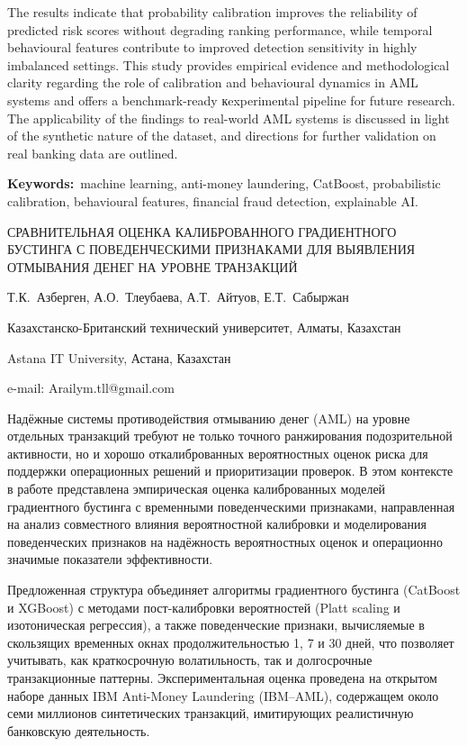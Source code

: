 The results indicate that probability calibration improves the
reliability of predicted risk scores without degrading ranking
performance, while temporal behavioural features contribute to improved
detection sensitivity in highly imbalanced settings. This study provides
empirical evidence and methodological clarity regarding the role of
calibration and behavioural dynamics in AML systems and offers a
benchmark-ready кexperimental pipeline for future research. The
applicability of the findings to real-world AML systems is discussed in
light of the synthetic nature of the dataset, and directions for further
validation on real banking data are outlined.

{\bfseries Keywords:}~machine learning, anti-money laundering, CatBoost,
probabilistic calibration, behavioural features, financial fraud
detection, explainable AI.

\begin{header}
СРАВНИТЕЛЬНАЯ ОЦЕНКА КАЛИБРОВАННОГО ГРАДИЕНТНОГО БУСТИНГА С ПОВЕДЕНЧЕСКИМИ ПРИЗНАКАМИ ДЛЯ ВЫЯВЛЕНИЯ ОТМЫВАНИЯ ДЕНЕГ НА УРОВНЕ ТРАНЗАКЦИЙ

Т.К.~Азберген,
А.О.~Тлеубаева\envelope,
А.Т.~Айтуов,
Е.Т.~Сабыржан
\end{header}

\begin{affil}
Казахстанско-Британский технический университет, Алматы, Казахстан

Astana IT University, Астана, Казахстан

e-mail: Arailym.tll@gmail.com
\end{affil}

Надёжные системы противодействия отмыванию денег (AML) на уровне
отдельных транзакций требуют не только точного ранжирования
подозрительной активности, но и хорошо откалиброванных вероятностных
оценок риска для поддержки операционных решений и приоритизации
проверок. В этом контексте в работе представлена эмпирическая оценка
калиброванных моделей градиентного бустинга с временными поведенческими
признаками, направленная на анализ совместного влияния вероятностной
калибровки и моделирования поведенческих признаков на надёжность
вероятностных оценок и операционно значимые показатели эффективности.

Предложенная структура объединяет алгоритмы градиентного бустинга
(CatBoost и XGBoost) с методами пост-калибровки вероятностей (Platt
scaling и изотоническая регрессия), а также поведенческие признаки,
вычисляемые в скользящих временных окнах продолжительностью 1, 7 и 30
дней, что позволяет учитывать, как краткосрочную волатильность, так и
долгосрочные транзакционные паттерны. Экспериментальная оценка проведена
на открытом наборе данных IBM Anti-Money Laundering (IBM--AML),
содержащем около семи миллионов синтетических транзакций, имитирующих
реалистичную банковскую деятельность.


